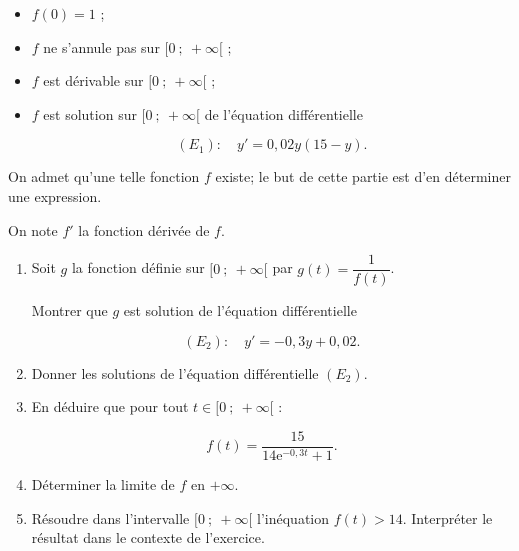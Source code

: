 \documentclass[10pt]{article}
\providecommand{\e}{{\mathrm{e}}}
\begin{document}
\begin{itemize}[label=$\bullet~$]
\item $f(0) = 1$ ;
\item $f$ ne s'annule pas sur $[0~;~ +\infty[$ ;
\item $f$ est dérivable sur $[0~;~ +\infty[$ ;
\item $f$ est solution sur $[0~;~ +\infty[$ de l'équation différentielle 

\[(E_1) : \quad y' =0,02y(15 - y).\]

\end{itemize}

On admet qu'une telle fonction $f$ existe; le but de cette partie est d'en déterminer une expression.

On note $f'$ la fonction dérivée de $f$.

\medskip

\begin{enumerate}
\item Soit $g$ la fonction définie sur $[0~;~ +\infty[$ par $g(t) = \dfrac{1}{f(t)}$.

Montrer que $g$ est solution de l'équation différentielle 

\[(E_2) : \quad y' = - 0,3y + 0,02.\]

\item Donner les solutions de l'équation différentielle $(E_2)$.
\item En déduire que pour tout $t \in  [0~;~ +\infty[$ :

\[f(t)=  \dfrac{15}{14\e^{-0,3t} + 1}.\]

\item Déterminer la limite de $f$ en $+\infty$.
\item Résoudre dans l'intervalle $[0~;~ +\infty[$ l'inéquation $f(t) > 14$. Interpréter le résultat dans le contexte de l'exercice.
\end{enumerate}
\end{document}
